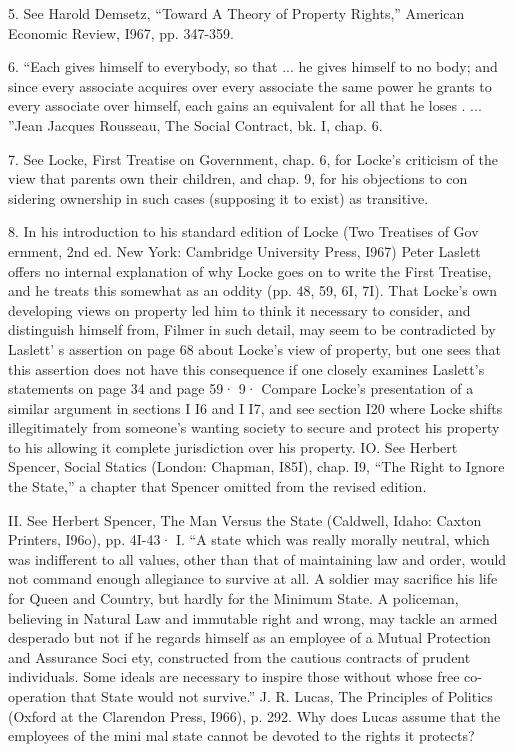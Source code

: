 \documentclass[11pt,openany]{book}
\begin{document}
{5. See Harold Demsetz, ``Toward A Theory of Property Rights,'' American Economic Review, I967, pp. 347-359.\par

6. ``Each gives himself to everybody, so that ... he gives himself to no body; and since every associate acquires over every associate the same power he grants to every associate over himself, each gains an equivalent for all that he loses . ... ''Jean Jacques Rousseau, The Social Contract, bk. I, chap. 6.\par

7. See Locke, First Treatise on Government, chap. 6, for Locke's criticism of the view that parents own their children, and chap. 9, for his objections to con sidering ownership in such cases (supposing it to exist) as transitive.\par

8. In his introduction to his standard edition of Locke (Two Treatises of Gov ernment, 2nd ed. New York: Cambridge University Press, I967) Peter Laslett offers no internal explanation of why Locke goes on to write the First Treatise, and he treats this somewhat as an oddity (pp. 48, 59, 6I, 7I). That Locke's own developing views on property led him to think it necessary to consider, and distinguish himself from, Filmer in such detail, may seem to be contradicted by Laslett' s assertion on page 68 about Locke's view of property, but one sees that this assertion does not have this consequence if one closely examines Laslett's statements on page 34 and page 59· 9· Compare Locke's presentation of a similar argument in sections I I6 and I I7, and see section I20 where Locke shifts illegitimately from someone's wanting society to secure and protect his property to his allowing it complete jurisdiction over his property. IO. See Herbert Spencer, Social Statics (London: Chapman, I85I), chap. I9, ``The Right to Ignore the State,'' a chapter that Spencer omitted from the revised edition.\par

II. See Herbert Spencer, The Man Versus the State (Caldwell, Idaho: Caxton Printers, I96o), pp. 4I-43· I. ``A state which was really morally neutral, which was indifferent to all values, other than that of maintaining law and order, would not command enough allegiance to survive at all. A soldier may sacrifice his life for Queen and Country, but hardly for the Minimum State. A policeman, believing in Natural Law and immutable right and wrong, may tackle an armed desperado but not if he regards himself as an employee of a Mutual Protection and Assurance Soci ety, constructed from the cautious contracts of prudent individuals. Some ideals are necessary to inspire those without whose free co-operation that State would not survive.'' J. R. Lucas, The Principles of Politics (Oxford at the Clarendon Press, I966), p. 292. Why does Lucas assume that the employees of the mini mal state cannot be devoted to the rights it protects?\par

}
\end{document}
